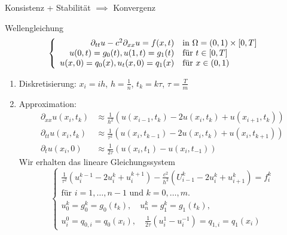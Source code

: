 \documentclass{cheat-sheet}
\begin{document}
\begin{bem}
  Konsistenz + Stabilität $\implies$ Konvergenz
\end{bem}
\fi


\begin{prob}
  Wellengleichung
  \[
    \left\{ \begin{array}{rl}
      \partial_{tt} u - c^2 \partial_{xx} u = f(x,t) & \text{in $\Omega = \left( 0, 1 \right) \times \left[ 0, T \right]$} \\
      u(0, t) = g_0(t), u(1, t) = g_1(t) & \text{für $t \in \left[ 0, T \right]$} \\
      u(x, 0) = q_0(x), u_t(x, 0) = q_1(x) & \text{für $x \in \left( 0, 1 \right)$}
    \end{array} \right.
  \]
\end{prob}

\begin{verf}
  \begin{enumerate}
    \item Diskretisierung: $x_i = ih$, $h = \tfrac{1}{n}$, $t_k = k \tau$, $\tau = \tfrac{T}{m}$
    \item Approximation:
    \begin{align*}
      \partial_{xx} u(x_i, t_k) & \approx \tfrac{1}{h^2} \left( u(x_{i-1}, t_k) - 2 u(x_i, t_k) + u(x_{i+1}, t_k) \right) \\
      \partial_{tt} u(x_i, t_k) & \approx \tfrac{1}{\tau^2} \left( u(x_i, t_{k-1}) - 2 u(x_i, t_k) + u(x_i, t_{k+1}) \right) \\
      \partial_t u(x_i, 0) & \approx \tfrac{1}{2 \tau} ( u(x_i, t_1) - u(x_i, t_{-1}) )
    \end{align*}
    Wir erhalten das lineare Gleichungssystem
    \[
      \left\{ \begin{array}{r}
        \tfrac{1}{\tau^2} (u_i^{k-1} - 2 u_i^k + u_i^{k+1}) - \tfrac{c^2}{h^2} ( U_{i-1}^k - 2 u_i^k + u_{i+1}^k) = f_i^k \\
        \text{für $i = 1, \ldots, n-1$ und $k = 0, \ldots, m$.} \\
        u_0^k = g_0^k = g_0(t_k), \quad
        u_n^k = g_1^k = g_1(t_k), \\
        u_i^0 = q_{0,i} = q_0(x_i), \quad
        \tfrac{1}{2 \tau} ( u_i^1 - u_i^{-1} ) = q_{1,i} = q_1(x_i)
      \end{array} \right.
    \]
  \end{enumerate}
\end{verf}
\end{document}

